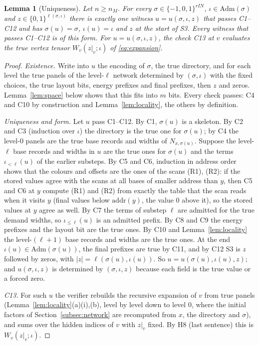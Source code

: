\documentclass[11pt]{article}
\newtheorem{lemma}[theorem]{Lemma}
\theoremstyle{definition}
\theoremstyle{remark}
\begin{document}
\begin{lemma}[Uniqueness]\label{lem:unique}
Let $n\ge n_M$. For every $\sigma\in\{-1,0,1\}^{rIN}$, $\iota\in\mathrm{Adm}(\sigma)$ and $z\in\{0,1\}^{\ell(\sigma,\iota)}$ there is
exactly one witness $u=u(\sigma,\iota,z)$ that passes C1--C12 and has $\sigma(u)=\sigma$, $\iota(u)=\iota$ and $z$ at the start of
S3. Every witness that passes C1--C12 is of this form. For $u=u(\sigma,\iota,z)$, the check C13 at $v$ evaluates the true vertex
tensor $W_v(z|_v;\iota)$ of \eqref{eq:expansion}.
\end{lemma}
\begin{proof}
\emph{Existence.} Write into $u$ the encoding of $\sigma$, the true directory, and for each level the true panels of the level-$\ell$
network determined by $(\sigma,\iota)$ with the fixed choices, the true layout bits, energy prefixes and final prefixes, then $z$
and zeros. Lemma~\ref{lem:space} below shows that this fits into $m$ bits. Every check passes: C4 and C10 by construction and
Lemma~\ref{lem:locality}, the others by definition.

\emph{Uniqueness and form.} Let $u$ pass C1--C12. By C1, $\sigma(u)$ is a skeleton. By C2 and C3 (induction over $\iota$) the
directory is the true one for $\sigma(u)$; by C4 the level-$0$ panels are the true base records and widths of $N_{x,\sigma(u)}$.
Suppose the level-$\ell$ base records and widths in $u$ are the true ones for $\sigma(u)$ and the terms $\iota_{<\ell}(u)$ of the
earlier substeps. By C5 and C6, induction in address order shows that the colours and offsets are the ones of the scans (R1),
(R2): if the stored values agree with the scans at all bases of smaller address than $y$, then C5 and C6 at $y$ compute (R1) and
(R2) from exactly the table that the scan reads when it visits $y$ (final values below $\mathrm{addr}(y)$, the value $0$ above it),
so the stored values at $y$ agree as well. By C7
the terms of substep $\ell$ are admitted for the true demand widths, so $\iota_{\le\ell}(u)$ is an admitted prefix. By C8 and C9
the energy prefixes and the layout bit are the true ones. By C10 and Lemma~\ref{lem:locality} the level-$(\ell+1)$ base records and
widths are the true ones. At the end $\iota(u)\in\mathrm{Adm}(\sigma(u))$, the final prefixes are true by C11, and by C12 S3 is
$z$ followed by zeros, with $|z|=\ell(\sigma(u),\iota(u))$. So $u=u(\sigma(u),\iota(u),z)$; and $u(\sigma,\iota,z)$ is determined by
$(\sigma,\iota,z)$ because each field is the true value or a forced zero.

\emph{C13.} For such $u$ the verifier rebuilds the recursive expansion of $v$ from true panels (Lemma~\ref{lem:locality}(a)(i),(b),
level by level down to level $0$, where the initial factors of Section~\ref{subsec:network} are recomputed from $x$, the directory and
$\sigma$), and sums over the hidden indices of $v$ with $z|_v$ fixed. By H8 (last sentence) this is $W_v(z|_v;\iota)$.
\end{proof}
\end{document}
